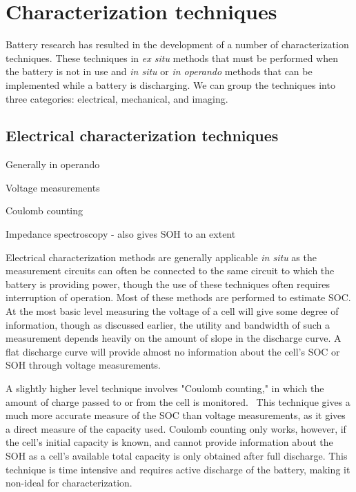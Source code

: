 \section{Characterization techniques}
\label{sec:pastwork:characterization}

Battery research has resulted in the development of a number of characterization techniques. These techniques in \textit{ex situ} methods that must be performed when the battery is not in use and \textit{in situ} or \textit{in operando} methods that can be implemented while a battery is discharging. We can group the techniques into three categories: electrical, mechanical, and imaging.  

\subsection{Electrical characterization techniques}

Generally in operando

Voltage measurements

Coulomb counting

Impedance spectroscopy - also gives SOH to an extent

Electrical characterization methods are generally applicable \textit{in situ} as the measurement circuits can often be connected to the same circuit to which the battery is providing power, though the use of these techniques often requires interruption of operation. Most of these methods are performed to estimate SOC. At the most basic level measuring the voltage of a cell will give some degree of information, though as discussed earlier, the utility and bandwidth of such a measurement depends heavily on the amount of slope in the discharge curve. A flat discharge curve will provide almost no information about the cell's SOC or SOH through voltage measurements.

A slightly higher level technique involves "Coulomb counting," in which the amount of charge passed to or from the cell is monitored.~\cite{Piller2001-xs} This technique gives a much more accurate measure of the SOC than voltage measurements, as it gives a direct measure of the capacity used. Coulomb counting only works, however, if the cell's initial capacity is known, and cannot provide information about the SOH as a cell's available total capacity is only obtained after full discharge. This technique is time intensive and requires active discharge of the battery, making it non-ideal for characterization.

